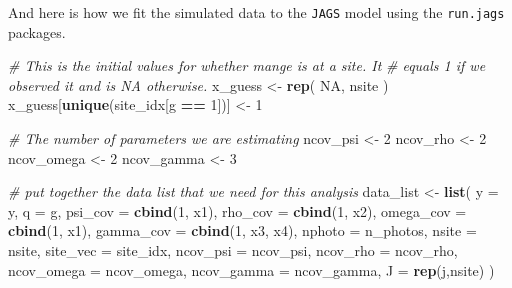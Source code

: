 \documentclass[
]{article}
\newenvironment{Shaded}{\begin{snugshade}}{\end{snugshade}}
\newcommand{\CommentTok}[1]{\textcolor[rgb]{0.56,0.35,0.01}{\textit{#1}}}
\newcommand{\DataTypeTok}[1]{\textcolor[rgb]{0.13,0.29,0.53}{#1}}
\newcommand{\DecValTok}[1]{\textcolor[rgb]{0.00,0.00,0.81}{#1}}
\newcommand{\KeywordTok}[1]{\textcolor[rgb]{0.13,0.29,0.53}{\textbf{#1}}}
\newcommand{\NormalTok}[1]{#1}
\newcommand{\OperatorTok}[1]{\textcolor[rgb]{0.81,0.36,0.00}{\textbf{#1}}}
\newcommand{\OtherTok}[1]{\textcolor[rgb]{0.56,0.35,0.01}{#1}}
\newcommand{\StringTok}[1]{\textcolor[rgb]{0.31,0.60,0.02}{#1}}
\begin{document}
And here is how we fit the simulated data to the \texttt{JAGS} model
using the \texttt{run.jags} packages.

\begin{Shaded}
\begin{Highlighting}[]
\CommentTok{# This is the initial values for whether mange is at a site. It}
\CommentTok{#  equals 1 if we observed it and is NA otherwise.}
\NormalTok{x_guess <-}\StringTok{ }\KeywordTok{rep}\NormalTok{(}
  \OtherTok{NA}\NormalTok{, }
\NormalTok{  nsite}
\NormalTok{) }
\NormalTok{x_guess[}\KeywordTok{unique}\NormalTok{(site_idx[g }\OperatorTok{==}\StringTok{ }\DecValTok{1}\NormalTok{])] <-}\StringTok{ }\DecValTok{1}

\CommentTok{# The number of parameters we are estimating}
\NormalTok{ncov_psi <-}\StringTok{ }\DecValTok{2}
\NormalTok{ncov_rho <-}\StringTok{ }\DecValTok{2}
\NormalTok{ncov_omega <-}\StringTok{ }\DecValTok{2}
\NormalTok{ncov_gamma <-}\StringTok{ }\DecValTok{3}

\CommentTok{# put together the data list that we need for this analysis}
\NormalTok{data_list <-}\StringTok{ }\KeywordTok{list}\NormalTok{(}
  \DataTypeTok{y =}\NormalTok{ y, }
  \DataTypeTok{q =}\NormalTok{ g, }
  \DataTypeTok{psi_cov =} \KeywordTok{cbind}\NormalTok{(}\DecValTok{1}\NormalTok{, x1),}
  \DataTypeTok{rho_cov =} \KeywordTok{cbind}\NormalTok{(}\DecValTok{1}\NormalTok{, x2),}
  \DataTypeTok{omega_cov =} \KeywordTok{cbind}\NormalTok{(}\DecValTok{1}\NormalTok{, x1),}
  \DataTypeTok{gamma_cov =} \KeywordTok{cbind}\NormalTok{(}\DecValTok{1}\NormalTok{, x3, x4),}
  \DataTypeTok{nphoto =}\NormalTok{ n_photos,}
  \DataTypeTok{nsite =}\NormalTok{ nsite,}
  \DataTypeTok{site_vec =}\NormalTok{ site_idx,}
  \DataTypeTok{ncov_psi =}\NormalTok{ ncov_psi,}
  \DataTypeTok{ncov_rho =}\NormalTok{ ncov_rho,}
  \DataTypeTok{ncov_omega =}\NormalTok{ ncov_omega,}
  \DataTypeTok{ncov_gamma =}\NormalTok{ ncov_gamma,}
  \DataTypeTok{J =} \KeywordTok{rep}\NormalTok{(j,nsite)}
\NormalTok{)}



\end{Highlighting}
\end{Shaded}
\end{document}
